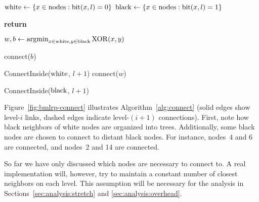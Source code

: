 \documentclass[conference]{IEEEtran}
\theoremstyle{definition}
\DeclareMathOperator*{\argmin}{\arg\!\min}
\begin{document}
\begin{algorithm}
    \begin{algorithmic}[1]
            \State ${\rm white} \gets \{x \in {\rm nodes}: {\rm bit}(x, l) = 0\}$
            \State ${\rm black} \gets \{x \in {\rm nodes}: {\rm bit}(x, l) = 1\}$
            
                \State \textbf{return}
            \EndIf

            \State $w,b \gets \argmin_{x \in {\rm white}, y \in {\rm black}}{\rm XOR}(x, y)$

                    \State connect($b$)
                \EndIf
                
                \State ConnectInside(${\rm white}$, $l + 1$)
            \Else
                    \State connect($w$)
                \EndIf

                \State ConnectInside(${\rm black}$, $l + 1$)
            \EndIf
        \EndProcedure
    \end{algorithmic}
\end{algorithm}

Figure~\ref{fig:bmlrp-connect} illustrates Algorithm~\ref{alg:connect} (solid edges show level-$i$ links, dashed edges indicate level-$(i+1)$ connections). First, note how black neighbors of white nodes are organized into trees. Additionally, some black nodes are chosen to connect to distant black nodes. For instance, nodes~4 and 6 are connected, and nodes~2 and 14 are connected.

So far we have only discussed which nodes are necessary to connect to. A real implementation will, however, try to maintain a constant number of closest neighbors on each level. This assumption will be necessary for 
the analysis in Sections~\ref{sec:analysis:stretch} and \ref{sec:analysis:overhead}.
\end{document}
